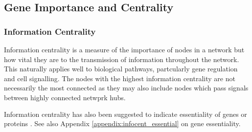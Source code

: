 \begin{table*}[!htb]
\caption{ANOVA for Synthetic Lethality and Vertex Degree}
\label{tab:SL_Pathway_PI3K_Vertex_Degree}
\noindent\makebox[\textwidth][c]{%
\begin{threeparttable}
\begin{tabular}{lccccc}
\hline
                 & DF & Sum Squares & Mean Squares & F-value & p-value \\
\hline
\rowcolor{black!10}
siRNA              &     1    &    15     &    15.50     &    0.0134    &    0.9082 \\
\rowcolor{black!5}
SLIPT              &     1    &    506    &    506.01    &    0.4378    &    0.5105 \\
\rowcolor{black!10}
siRNA$\times$SLIPT     &     1    &    0      &    0.05      &   0.0000     &    0.9947 \\
\hline
\end{tabular}
\begin{tablenotes}
\raggedright \small
ANOVA for Synthetic Lethality and Vertex Degree
\end{tablenotes}
\end{threeparttable}
}
\end{table*}

\FloatBarrier

\subsection{Gene Importance and Centrality}  \label{chapt4:Network_Centrality}

\subsubsection{Information Centrality}  \label{chapt4:Network_InfoCent}

Information centrality is a measure of the importance of nodes in a network but how vital they are to the transmission of information throughout the network. This naturally applies well to biological pathways, partcularly gene regulation and cell signalling. The nodes with the highest information centrality are not necessarily the most connected as they may also include nodes which pass signals between highly connected netwprk hubs. 

Information centrality has also been suggested to indicate essentiality of genes or proteins \citep{Kranthi2013}. See also Appendix \ref{appendix:infocent_essential} on gene essentiality.

